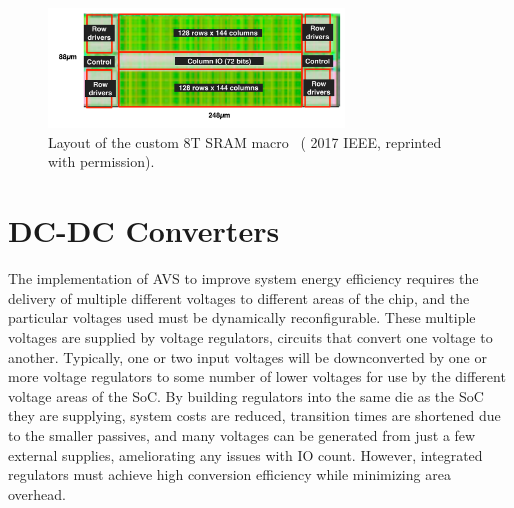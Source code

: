 \documentclass[graybox]{svmult}
\begin{document}
\begin{figure}
  \centering
  \includegraphics[width=0.7\textwidth]{sram}
  \caption{Layout of the custom 8T SRAM macro~\cite{Keller2017} ({\textcopyright} 2017 IEEE, reprinted with permission).}
  \label{fig:sram}
\end{figure}


\section{DC-DC Converters}
\label{sec:sc-dcdc}

The implementation of AVS to improve system energy efficiency requires the delivery of multiple different voltages to different areas of the chip, and the particular voltages used must be dynamically reconfigurable.
These multiple voltages are supplied by voltage regulators, circuits that convert one voltage to another.
Typically, one or two input voltages will be downconverted by one or more voltage regulators to some number of lower voltages for use by the different voltage areas of the SoC.
By building regulators into the same die as the SoC they are supplying, system costs are reduced, transition times are shortened due to the smaller passives, and many voltages can be generated from just a few external supplies, ameliorating any issues with IO count.
However, integrated regulators must achieve high conversion efficiency while minimizing area overhead.

\end{document}
